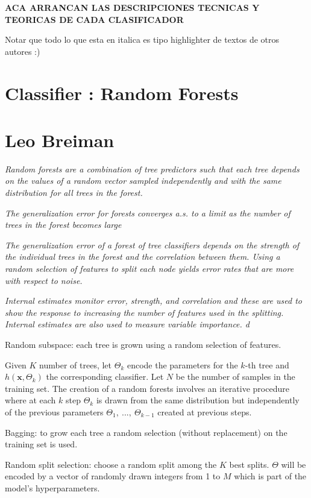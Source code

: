 \textbf{ACA ARRANCAN LAS DESCRIPCIONES TECNICAS Y TEORICAS DE CADA CLASIFICADOR}

Notar que todo lo que esta en italica es tipo highlighter de textos de otros autores :)


\section{Classifier : Random Forests}


\section{Leo Breiman}


\textit{
Random forests are a combination of tree predictors
such that each tree depends on the values of a random
vector sampled independently and with the same
distribution for all trees in the forest.}

\textit{The generalization error for forests converges a.s. to a limit
as the number of trees in the forest becomes large}

\textit{The generalization error of a forest of tree classifiers depends on the strength of the individual trees in the
forest and the correlation between them. Using a random selection of features to split each node yields
error rates that are more with respect to noise.}

\textit{Internal estimates monitor error, strength, and correlation and these are used to show
the response to increasing the number of features used in the splitting. Internal estimates are also used to
measure variable importance.
d}



Random subspace: each tree is grown using a random selection of features.

Given $K$ number of trees, let $\Theta_k$ encode the parameters for the $k$-th tree and $h(\textbf{x},\Theta_k)$ the corresponding classifier. Let $N$ be the number of samples in the training set. The creation of a random forests involves an iterative procedure where at each $k$ step $\Theta_k$ is drawn from the same distribution but independently of the previous parameters $\Theta_1, \ ..., \ \Theta_{k-1}$ created at previous steps. 

Bagging: to grow each tree a random selection (without replacement) on the training set is used. 

Random split selection: choose a random split among the $K$ best splits. $\Theta$ will be encoded by a vector of randomly drawn integers from 1 to $M$ which is part of the model's hyperparameters.


